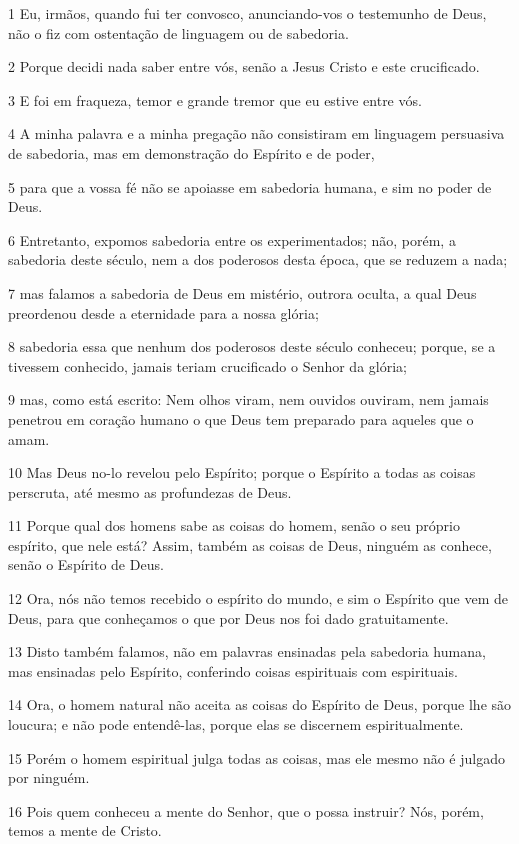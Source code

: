 \par 1 Eu, irmãos, quando fui ter convosco, anunciando-vos o testemunho de Deus, não o fiz com ostentação de linguagem ou de sabedoria.
\par 2 Porque decidi nada saber entre vós, senão a Jesus Cristo e este crucificado.
\par 3 E foi em fraqueza, temor e grande tremor que eu estive entre vós.
\par 4 A minha palavra e a minha pregação não consistiram em linguagem persuasiva de sabedoria, mas em demonstração do Espírito e de poder,
\par 5 para que a vossa fé não se apoiasse em sabedoria humana, e sim no poder de Deus.
\par 6 Entretanto, expomos sabedoria entre os experimentados; não, porém, a sabedoria deste século, nem a dos poderosos desta época, que se reduzem a nada;
\par 7 mas falamos a sabedoria de Deus em mistério, outrora oculta, a qual Deus preordenou desde a eternidade para a nossa glória;
\par 8 sabedoria essa que nenhum dos poderosos deste século conheceu; porque, se a tivessem conhecido, jamais teriam crucificado o Senhor da glória;
\par 9 mas, como está escrito: Nem olhos viram, nem ouvidos ouviram, nem jamais penetrou em coração humano o que Deus tem preparado para aqueles que o amam.
\par 10 Mas Deus no-lo revelou pelo Espírito; porque o Espírito a todas as coisas perscruta, até mesmo as profundezas de Deus.
\par 11 Porque qual dos homens sabe as coisas do homem, senão o seu próprio espírito, que nele está? Assim, também as coisas de Deus, ninguém as conhece, senão o Espírito de Deus.
\par 12 Ora, nós não temos recebido o espírito do mundo, e sim o Espírito que vem de Deus, para que conheçamos o que por Deus nos foi dado gratuitamente.
\par 13 Disto também falamos, não em palavras ensinadas pela sabedoria humana, mas ensinadas pelo Espírito, conferindo coisas espirituais com espirituais.
\par 14 Ora, o homem natural não aceita as coisas do Espírito de Deus, porque lhe são loucura; e não pode entendê-las, porque elas se discernem espiritualmente.
\par 15 Porém o homem espiritual julga todas as coisas, mas ele mesmo não é julgado por ninguém.
\par 16 Pois quem conheceu a mente do Senhor, que o possa instruir? Nós, porém, temos a mente de Cristo.

